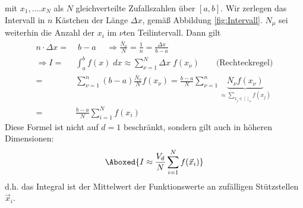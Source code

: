 \documentclass[12pt]{article}
\begin{document}
mit $x_1,....x_N$ als $N$ gleichverteilte Zufallszahlen über $[a,b]$. 
Wir zerlegen das Intervall in $n$ Kästchen der Länge $\Delta x$, gemäß Abbildung \ref{fig:Intervall}.
$N_\mu$ sei weiterhin die Anzahl der $x_i$ im $\nu$ten Teilintervall. Dann gilt
\begin{align}
n \cdot \Delta x =&\;  b-a \; \quad
\Rightarrow \frac{\overline{N}_\nu}{N}= \frac{1}{n}= \frac{\Delta x}{b-a} \\
 \Rightarrow I= & \int_a^b f(x) \; dx  \approx  \sum_{\nu =1}^N \Delta x \; f(x_\nu )  \quad \quad \mbox{(Rechteckregel)} \\
 =& \sum_{\nu =1}^n (b-a)  \frac{\overline{N}_\nu}{N} f(x_\nu) 
= \frac{b-a}{N} \sum_{\nu =1}^n \underbrace{\overline{N}_\nu f(x_\nu)}_{ \approx \sum_{x_j \in [\,]_\nu} f(x_j)} \\ =& \frac{b-a}{N} \sum_{i=1}^N f(x_i)
\end{align}
Diese Formel ist nicht auf $d=1$ beschränkt, sondern gilt auch in höheren Dimensionen:
\begin{align}
\Aboxed{ I \approx \frac{V_d}{N} \sum_{i=1}^N f(\vec{x}_i) }
\end{align}
d.h. das Integral ist der Mittelwert der Funktionswerte an zufälligen Stützstellen $\vec{x}_i$.\\
\end{document}

